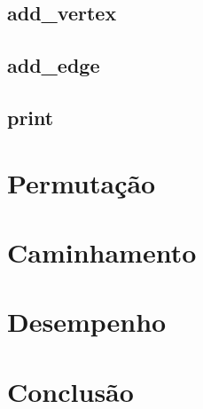 \documentclass[12pt]{article}
\begin{document}
  \subsection{add\_vertex}

  \subsection{add\_edge}

  \subsection{print}

  \section{Permutação} \label{sec:permutation}

  \section{Caminhamento} \label{sec:walking}

  \section{Desempenho} \label{sec:performance}

  \section{Conclusão} \label{sec:conclusion}
\end{document}
